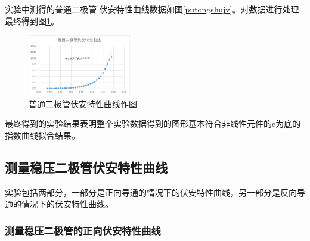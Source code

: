 \documentclass{ctexart}
\begin{document}
  实验中测得的普通二极管
  伏安特性曲线数据如图\ref{putongshujv}。对数据进行处理最终得到图\ref{putongzuotu}。

  \begin{figure}[H]\label{putongzuotu}
    \centering
    \includegraphics[width=0.4\textwidth,height=0.3\textheight]{putongzuotu.png}
    \caption{普通二极管伏安特性曲线作图}
  \end{figure}

  最终得到的实验结果表明整个实验数据得到的图形基本符合非线性元件的e为底的指数曲线拟合结果。
  \subsection{测量稳压二极管伏安特性曲线}
  实验包括两部分，一部分是正向导通的情况下的伏安特性曲线，另一部分是反向导通的情况下的伏安特性曲线。
  
  \subsubsection{测量稳压二极管的正向伏安特性曲线}
\end{document}
